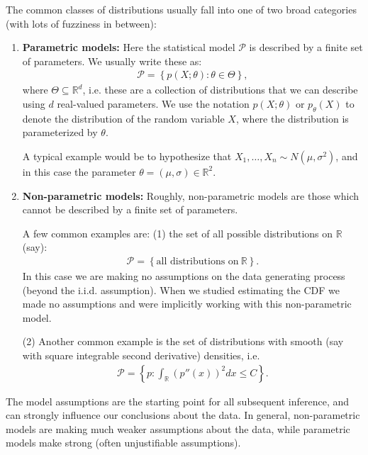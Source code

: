 \documentclass[twoside,12pt]{article}
\begin{document}
The common classes of distributions usually fall into one of two broad categories (with lots of fuzziness in between):
\begin{enumerate}
\item {\bf Parametric models: } Here the statistical model $\mathcal{P}$ is described by a finite set of parameters. We usually write these as:
\begin{align*}
\mathcal{P} = \left\{ p(X; \theta) : \theta \in \Theta \right\},
\end{align*}
where $\Theta \subseteq \mathbb{R}^d$, i.e. these are a collection of distributions that we can describe using $d$ real-valued parameters. We use the notation $p(X; \theta)$ or $p_{\theta}(X)$ to denote the distribution of the random variable $X$, where the distribution is parameterized by $\theta$.

A typical example would be to hypothesize that $X_1,\ldots,X_n \sim N(\mu,\sigma^2)$, and in this case the parameter $\theta = (\mu, \sigma) \in \mathbb{R}^2$.
\item {\bf Non-parametric models: } Roughly, non-parametric models are those which cannot be described by a finite set of parameters. 

A few common examples are: (1) the set of all possible distributions on $\mathbb{R}$ (say):
\begin{align*}
\mathcal{P} = \left\{ \text{all distributions on}~\mathbb{R} \right\}.
\end{align*}
In this case we are making no assumptions on the data generating process (beyond the i.i.d. assumption). When we studied estimating the CDF we made no assumptions and were implicitly working with this non-parametric model.

(2) Another common example is the set of distributions with smooth (say with square integrable second derivative) densities, i.e. 
\begin{align*}
\mathcal{P} = \left\{ p:  \int_{\mathbb{R}} (p''(x))^2 dx \leq C  \right\}.
\end{align*}

\end{enumerate}

The model assumptions are the starting point for all subsequent inference, and can strongly influence our conclusions about the data. In general, non-parametric models are making much weaker assumptions about the data, while parametric models make strong (often unjustifiable assumptions).
\end{document}
